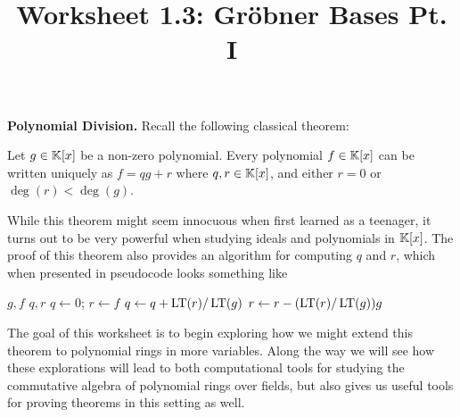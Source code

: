 \documentclass[12pt,reqno]{amsart}
\title{Worksheet 1.3: Gr\"{o}bner Bases Pt. I}
\begin{document}

\maketitle
\thispagestyle{firstpageIP}

 \textbf{Polynomial Division.} Recall the following classical theorem: 

\begin{theorem}\label{thm:division-alg}
Let $g \in \mathbb{K}[x]$ be a non-zero polynomial. Every polynomial $f\in \mathbb{K}[x]$ can be written uniquely as $f=qg+r$ where $q,r \in \mathbb{K}[x]$, and either $r=0$ or $\deg(r) < \deg(g)$. 
\end{theorem}

While this theorem might seem innocuous when first learned as a teenager, it turns out to be very powerful when studying ideals and polynomials in $\mathbb{K}[x]$. The proof of this theorem also provides an algorithm for computing $q$ and $r$, which when presented in pseudocode looks something like

\begin{algorithm}
\caption{Division Algorithm}
\begin{algorithmic}
\Require $g, f$
\Ensure $q, r$
\State $q \gets 0$; $r \gets f$
    \State $q \gets q + \operatorname{LT}(r)/\operatorname{LT}(g)$
    \State $r \gets r - (\operatorname{LT}(r)/\operatorname{LT}(g))g$
\EndWhile
\end{algorithmic}
\end{algorithm}

The goal of this worksheet is to begin exploring how we might extend this theorem to polynomial rings in more variables. Along the way we will see how these explorations will lead to both computational tools for studying the commutative algebra of polynomial rings over fields, but also gives us useful tools for proving theorems in this setting as well. 

\hrulefill
\end{document}
